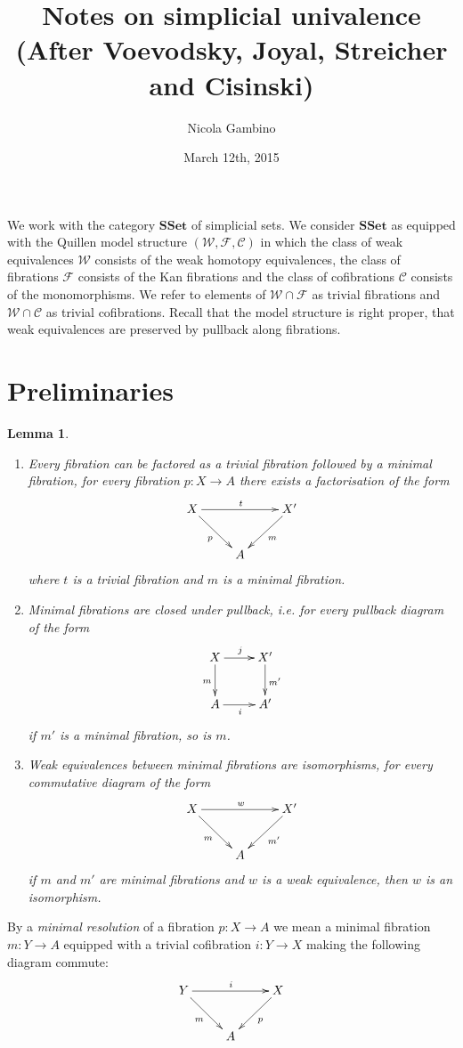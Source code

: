 \documentclass[reqno,10pt,a4paper,oneside]{amsart}
\author[]{Nicola Gambino}
\title[Simplicial univalence]{Notes on simplicial univalence \\ (After Voevodsky, Joyal, Streicher and Cisinski)}
\date{March 12th, 2015}
\newcommand{\ie}{\text{i.e.\ }}
\newtheorem{lemma}[theorem]{Lemma}
\theoremstyle{definition}
\newcommand{\co}{\colon}
\newcommand{\SSet}{\mathbf{SSet}}
\begin{document}
\maketitle


We work with the category $\SSet$ of simplicial sets. We consider $\SSet$ as equipped with the Quillen model structure $(\mathcal{W},
\mathcal{F}, \mathcal{C})$ in which the class of weak equivalences  $\mathcal{W}$ consists of the weak homotopy equivalences, the class of fibrations $\mathcal{F}$ consists of the Kan
fibrations and the class of cofibrations $\mathcal{C}$ consists of the monomorphisms. We refer to
elements of $\mathcal{W} \cap \mathcal{F}$ as trivial fibrations and $\mathcal{W} \cap \mathcal{C}$
as trivial cofibrations. Recall that the model structure is right proper, \ie that weak equivalences are
preserved by pullback along fibrations.


\section{Preliminaries}


\begin{lemma} \label{thm:minfib} \hfill 
\begin{enumerate}[$(i)$]
\item Every fibration can be factored as a trivial fibration followed by a minimal fibration, \ie 
for every fibration $p \co X \to A$ there exists a factorisation of the form
\[
\xymatrix{
X \ar[rr]^{t} \ar[dr]_p & & X' \ar[dl]^{m} \\
 & A & }
 \]
 where $t$ is a trivial fibration and $m$ is a minimal fibration.
 \item Minimal fibrations are closed under pullback, i.e. for every pullback diagram of the
 form
 \[
 \xymatrix{
 X \ar[r]^j \ar[d]_{m} & X' \ar[d]^{m'} \\
 A \ar[r]_i  & A' }
 \]
 if $m'$ is a minimal fibration, so is $m$.
 \item Weak equivalences between minimal fibrations are isomorphisms, \ie for every 
 commutative diagram of the form
 \[
\xymatrix{
X \ar[rr]^{w} \ar[dr]_m & & X' \ar[dl]^{m'} \\
 & A & }
 \]
if $m$ and $m'$ are minimal fibrations and $w$ is a weak equivalence, then $w$ 
is an isomorphism.
\end{enumerate}
\end{lemma}

By a \emph{minimal resolution} of a fibration $p \co X \to A$ we mean a minimal fibration $m \co Y
\to A$ equipped with a trivial cofibration $i \co Y \to X$ making the following diagram commute:
\[
\xymatrix{
Y \ar[rr]^{i} \ar[dr]_{m} & & X \ar[dl]^{p} \\
 & A & }
 \]
 
\end{document}

